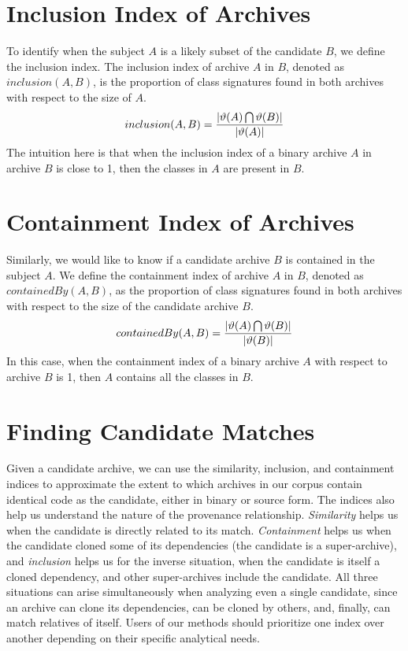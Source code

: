 \section{Inclusion Index of Archives}

To identify when the subject $A$ is a likely subset of the candidate $B$, we
define the inclusion index.
The inclusion index of archive $A$ in $B$,
denoted as $inclusion(A,B)$, is the proportion of class signatures found
in both archives with respect to the size of $A$.
\[ inclusion(A,B) = {{| \vartheta(A) \bigcap \vartheta(B) |
  }\over{| \ensuremath{\vartheta(A)}}| }\]
The intuition here is that when the inclusion index of a binary archive $A$
in archive $B$ is close to 1, then the classes in $A$ are present in $B$.


\section{Containment Index of Archives}

Similarly, we would like to know if a candidate archive $B$ is contained in the
subject $A$.  We define the containment index of archive $A$ in $B$,
denoted as $containedBy(A,B)$, as the proportion of class signatures
found in both archives with respect to the size of the candidate archive
$B$.
\[ containedBy(A,B) = {{| \vartheta(A) \bigcap \vartheta(B) |
  }\over{| \ensuremath{\vartheta(B)}}| }\]
In this case, when the containment index of a binary archive $A$ with respect to
archive $B$ is 1, then $A$ contains all the classes in $B$.

\section{Finding Candidate Matches} %
\label{sec:finding}

Given a candidate archive, we can use the similarity,
inclusion, and containment indices to approximate the
extent to which archives in our corpus contain identical
code as the candidate, either in binary or source form.
The indices also help us understand the nature of the
provenance relationship.  \emph{Similarity} helps us when
the candidate is directly related to its match.
\emph{Containment} helps us when the candidate cloned some
of its dependencies (the candidate is a super-archive),
and \emph{inclusion} helps us for the inverse situation,
when the candidate is itself a cloned dependency,
and other super-archives include the candidate.
All three situations can arise simultaneously when
analyzing even a single candidate, since an archive can
clone its dependencies, can be cloned by others, and,
finally, can match relatives of itself.  Users of our
methods should prioritize one index over another depending
on their specific analytical needs.

